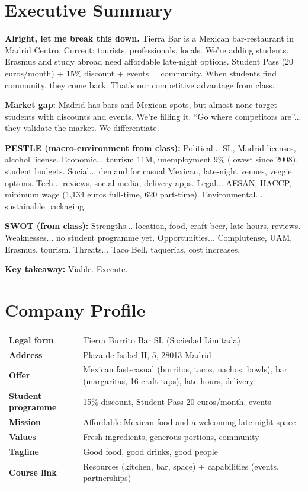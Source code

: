 \documentclass[11pt,a4paper]{article}
\begin{document}
\vspace{1em}

\section{Executive Summary}

\textbf{Alright, let me break this down.} Tierra Bar is a Mexican bar-restaurant in Madrid Centro. Current: tourists, professionals, locals. We're adding students. Erasmus and study abroad need affordable late-night options. Student Pass (20 euros/month) + 15\% discount + events = community. When students find community, they come back. That's our competitive advantage from class.

\textbf{Market gap:} Madrid has bars and Mexican spots, but almost none target students with discounts and events. We're filling it. ``Go where competitors are''... they validate the market. We differentiate.

\textbf{PESTLE (macro-environment from class):} Political... SL, Madrid licenses, alcohol license. Economic... tourism 11M, unemployment 9\% (lowest since 2008), student budgets. Social... demand for casual Mexican, late-night venues, veggie options. Tech... reviews, social media, delivery apps. Legal... AESAN, HACCP, minimum wage (1,134 euros full-time, 620 part-time). Environmental... sustainable packaging.

\textbf{SWOT (from class):} Strengths... location, food, craft beer, late hours, reviews. Weaknesses... no student programme yet. Opportunities... Complutense, UAM, Erasmus, tourism. Threats... Taco Bell, taquer\'ias, cost increases.

\textbf{Key takeaway:} Viable. Execute.

\vspace{1em}

\section{Company Profile}

\begin{tabular}{@{}ll@{}}
\textbf{Legal form} & Tierra Burrito Bar SL (Sociedad Limitada) \\
\textbf{Address} & Plaza de Isabel II, 5, 28013 Madrid \\
\textbf{Offer} & Mexican fast-casual (burritos, tacos, nachos, bowls), bar (margaritas, 16 craft taps), late hours, delivery \\
\textbf{Student programme} & 15\% discount, Student Pass 20 euros/month, events \\
\textbf{Mission} & Affordable Mexican food and a welcoming late-night space \\
\textbf{Values} & Fresh ingredients, generous portions, community \\
\textbf{Tagline} & Good food, good drinks, good people \\
\textbf{Course link} & Resources (kitchen, bar, space) + capabilities (events, partnerships) \\
\end{tabular}
\end{document}
